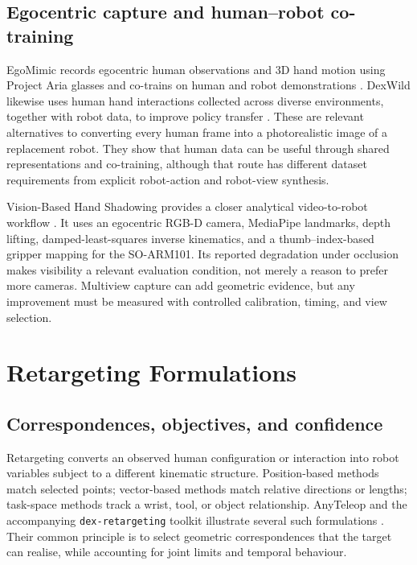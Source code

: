 \subsection{Egocentric capture and human--robot co-training}

EgoMimic records egocentric human observations and 3D hand motion using Project
Aria glasses and co-trains on human and robot demonstrations
\cite{egomimic}. DexWild likewise uses human hand interactions collected across
diverse environments, together with robot data, to improve policy transfer
\cite{dexwild}. These are relevant alternatives to converting every human
frame into a photorealistic image of a replacement robot. They show that human
data can be useful through shared representations and co-training, although
that route has different dataset requirements from explicit robot-action and
robot-view synthesis.

Vision-Based Hand Shadowing provides a closer analytical video-to-robot
workflow \cite{shadowing}. It uses an egocentric RGB-D camera, MediaPipe
landmarks, depth lifting, damped-least-squares inverse kinematics, and a
thumb--index-based gripper mapping for the SO-ARM101. Its reported degradation
under occlusion makes visibility a relevant evaluation condition, not merely
a reason to prefer more cameras. Multiview capture can add geometric evidence,
but any improvement must be measured with controlled calibration, timing, and
view selection.

\section{Retargeting Formulations}
\label{sec:lit-retarget}

\subsection{Correspondences, objectives, and confidence}

Retargeting converts an observed human configuration or interaction into robot
variables subject to a different kinematic structure. Position-based methods
match selected points; vector-based methods match relative directions or
lengths; task-space methods track a wrist, tool, or object relationship.
AnyTeleop and the accompanying \texttt{dex-retargeting} toolkit illustrate
several such formulations \cite{anyteleop, dexretargeting}. Their common
principle is to select geometric correspondences that the target can realise,
while accounting for joint limits and temporal behaviour.

